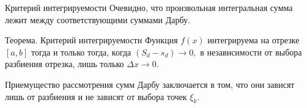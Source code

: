 \documentclass[8pt]{beamer}
\begin{document}
\begin{frame}{Критерий интегрируемости}
Очевидно, что произвольная интегральная сумма лежит между соответствующими суммами Дарбу.
\begin{block}{Теорема. Критерий интегрируемости}
Функция $f(x)$ интегрируема на отрезке $[a,b]$ тогда и только тогда, когда
$ (S_d - s_d) \to0,$
в независимости от выбора разбиения отрезка, лишь только $\Delta x\to 0$.
\end{block}
\begin{center}
\end{center}
Приемущество рассмотрения сумм Дарбу заключается в том, что они зависят лишь от разбиения и не зависят от выбора точек $\xi_k$.
\end{frame}
\end{document}
